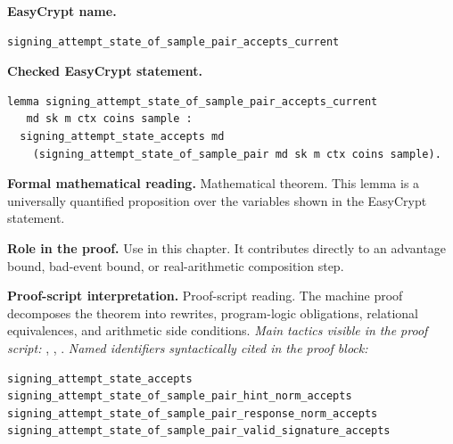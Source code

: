 \begin{formaltheorem}
\noindent\textbf{EasyCrypt name.}
\begin{lstlisting}[language=EasyCrypt,basicstyle=\ttfamily\scriptsize]
signing_attempt_state_of_sample_pair_accepts_current
\end{lstlisting}
\noindent\textbf{Checked EasyCrypt statement.}
\begin{lstlisting}[language=EasyCrypt,basicstyle=\ttfamily\scriptsize]
lemma signing_attempt_state_of_sample_pair_accepts_current
   md sk m ctx coins sample :
  signing_attempt_state_accepts md
    (signing_attempt_state_of_sample_pair md sk m ctx coins sample).
\end{lstlisting}
\noindent\textbf{Formal mathematical reading.}
Mathematical theorem. This lemma is a universally quantified proposition over the variables shown in the EasyCrypt statement.

\noindent\textbf{Role in the proof.}
Use in this chapter. It contributes directly to an advantage bound, bad-event bound, or real-arithmetic composition step.

\noindent\textbf{Proof-script interpretation.}
Proof-script reading. The machine proof decomposes the theorem into rewrites, program-logic obligations, relational equivalences, and arithmetic side conditions.
\emph{Main tactics visible in the proof script:} , , .
\emph{Named identifiers syntactically cited in the proof block:}
\begin{lstlisting}[language=EasyCrypt,basicstyle=\ttfamily\scriptsize]
signing_attempt_state_accepts
signing_attempt_state_of_sample_pair_hint_norm_accepts
signing_attempt_state_of_sample_pair_response_norm_accepts
signing_attempt_state_of_sample_pair_valid_signature_accepts
\end{lstlisting}

\end{formaltheorem}


